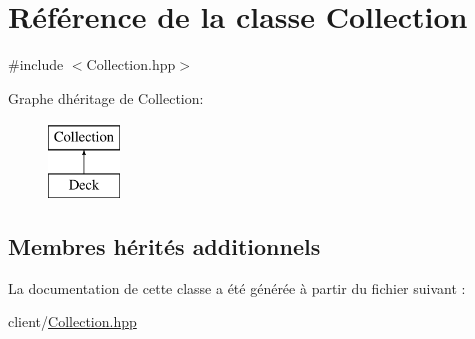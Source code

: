 \hypertarget{classCollection}{}\section{Référence de la classe Collection}
\label{classCollection}


{\ttfamily \#include $<$Collection.\+hpp$>$}

Graphe d\textquotesingle{}héritage de Collection\+:\begin{figure}[H]
\begin{center}
\leavevmode
\includegraphics[height=2.000000cm]{classCollection}
\end{center}
\end{figure}
\subsection*{Membres hérités additionnels}


La documentation de cette classe a été générée à partir du fichier suivant \+:\begin{DoxyCompactItemize}
\item 
client/\hyperlink{client_2Collection_8hpp}{Collection.\+hpp}\end{DoxyCompactItemize}
